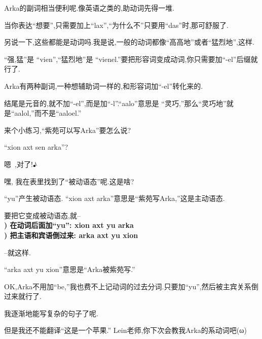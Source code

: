 Arka的副词相当便利呢.像英语之类的,助动词先得一堆.

当你表达``想要'',只需要加上``lax'',``为什么不''只要用``das''时,那可舒服了.

另说一下,这些都能是动词吗.我是说,一般的动词都像``高高地''或者``猛烈地'',这样.


``强,猛''是 ``vien'',``猛烈地''是 ``vienel.''要把形容词变成动词,你只需要加``-el''后缀就行了.

Arka有两种副词,一种想辅助词一样的,和形容词加``-el''转化来的.

结尾是元音的,就不加``-el'',而是加``-l''.``aalo''意思是 ``灵巧,''那么``灵巧地''就是``aalol,''而不是``aaloel.''

来个小练习,``紫苑可以写Arka''要怎么说?

``xion axt sen arka''?


嗯~,对了!♪


嘿, 我在表里找到了``被动语态''呢.这是啥?


``yu''产生被动语态. ``xion axt arka''意思是``紫苑写Arka,''这是主动语态.

要把它变成被动语态,就--\\
\textbf{
) 在动词后面加``yu'': xion axt yu arka\\
) 把主语和宾语倒过来: arka axt yu xion}

--就这样.

``arka axt yu xion''意思是``Arka被紫苑写.''


OK,Arka不用加``be,''我也费不上记动词的过去分词.只要加``yu'',然后被主宾关系倒过来就行了.

我逐渐地能写复杂的句子了呢.

但是我还不能翻译``这是一个苹果.''
Lein老师,你下次会教我Arka的系动词吧(\FiveStar ω\FiveStar)




